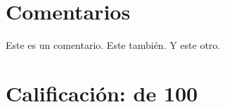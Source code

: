 \documentclass{article}
\begin{document}
\maketitle

\section*{Comentarios}
\begin{enumerate}
     Este es un comentario.
     Este también.
     Y este otro.
\end{enumerate}

\section*{Calificación: \grade de 100}

\appendhw
\end{document}
